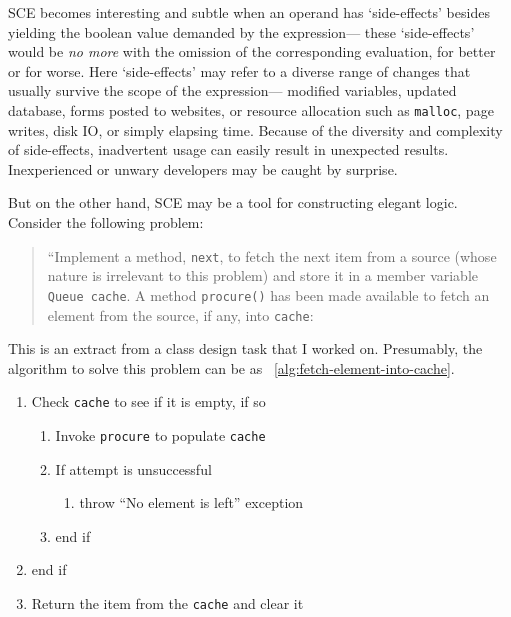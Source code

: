 \documentclass[oneside,11pt]{book}
\theoremstyle{definition}
\theoremstyle{remark}
\newcommand{\code}[1]{\mbox{\lstinline{#1}}}
\begin{document}
SCE becomes interesting and subtle when an operand has `side-effects'
besides yielding the boolean value demanded by the expression---
these `side-effects' would be \emph{no more} with the omission of the corresponding evaluation,
for better or for worse.
Here `side-effects' may refer to a diverse range of changes
that usually survive the scope of the expression---
modified variables, updated database, forms posted to websites,
or resource allocation such as \code{malloc}, page writes, disk IO, or simply elapsing time.
Because of the diversity and complexity of side-effects, inadvertent usage can easily result in
unexpected results.
Inexperienced or unwary developers may be caught by surprise.

But on the other hand, SCE may be a tool for constructing elegant logic.
Consider the following problem:
\begin{quote}
    ``Implement a method, \code{next}, to fetch the next item from a source
    (whose nature is irrelevant to this problem) and store it in a member variable
    \code{Queue cache}.
    A method \code{procure()} has been made available to fetch an element
    from the source, if any, into \code{cache}:
    
\end{quote}
This is an extract from a class design task that I worked on.
Presumably, the algorithm to solve this problem can be as ~\autoref{alg:fetch-element-into-cache}.
\begin{alisting}
    \caption{\label{alg:fetch-element-into-cache}}
    \begin{enumerate}
        \item Check \code{cache} to see if it is empty, if so
        \begin{enumerate}
            \item Invoke \code{procure} to populate \code{cache}
            \item If attempt is unsuccessful
            \begin{enumerate}[label={}]
                \item throw ``No element is left'' exception
            \end{enumerate}
            \item end if
        \end{enumerate}
        \item end if
        \item Return the item from the \code{cache} and clear it
    \end{enumerate}
\end{alisting}
\end{document}
